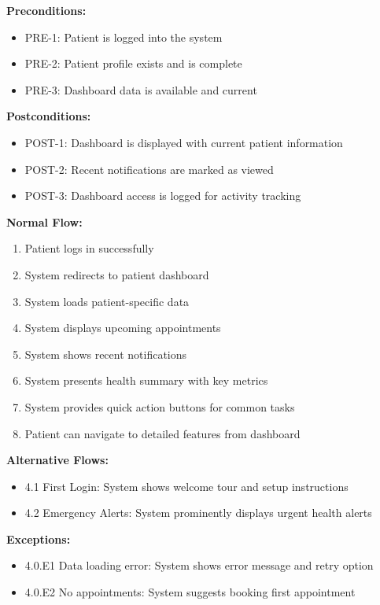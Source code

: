 \documentclass[12pt,a4paper]{article}
\begin{document}
\textbf{Preconditions:}
\begin{itemize}
\item PRE-1: Patient is logged into the system
\item PRE-2: Patient profile exists and is complete
\item PRE-3: Dashboard data is available and current
\end{itemize}

\textbf{Postconditions:}
\begin{itemize}
\item POST-1: Dashboard is displayed with current patient information
\item POST-2: Recent notifications are marked as viewed
\item POST-3: Dashboard access is logged for activity tracking
\end{itemize}

\textbf{Normal Flow:}
\begin{enumerate}
\item Patient logs in successfully
\item System redirects to patient dashboard
\item System loads patient-specific data
\item System displays upcoming appointments
\item System shows recent notifications
\item System presents health summary with key metrics
\item System provides quick action buttons for common tasks
\item Patient can navigate to detailed features from dashboard
\end{enumerate}

\textbf{Alternative Flows:}
\begin{itemize}
\item 4.1 First Login: System shows welcome tour and setup instructions
\item 4.2 Emergency Alerts: System prominently displays urgent health alerts
\end{itemize}

\textbf{Exceptions:}
\begin{itemize}
\item 4.0.E1 Data loading error: System shows error message and retry option
\item 4.0.E2 No appointments: System suggests booking first appointment
\end{itemize}
\end{document}
